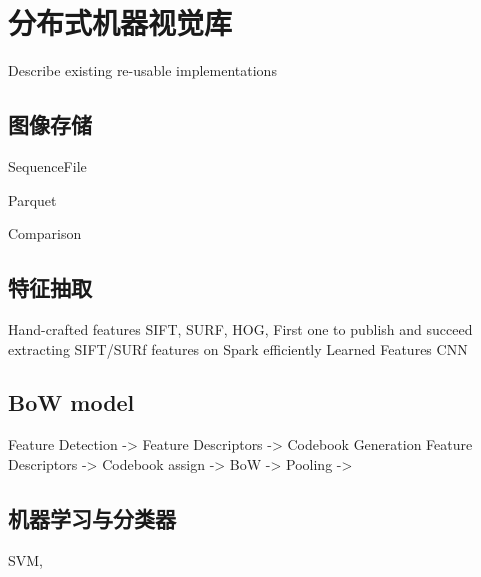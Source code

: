 \chapter{分布式机器视觉库}
\label{cha:distributed_vision_library}
Describe existing re-usable implementations

\section{图像存储}
SequenceFile

Parquet

Comparison

\section{特征抽取}
Hand-crafted features SIFT, SURF, HOG,
First one to publish and succeed extracting SIFT/SURf features on Spark efficiently
Learned Features CNN


\section{BoW model}
Feature Detection -> Feature Descriptors -> Codebook Generation
Feature Descriptors -> Codebook assign -> BoW -> Pooling -> 


\section{机器学习与分类器}
SVM, 
